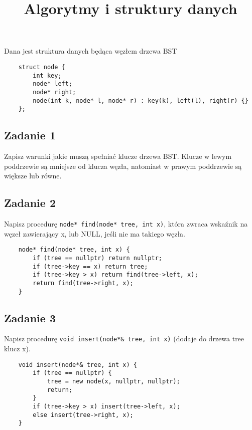 \documentclass{article}
\begin{document}
\title{Algorytmy i struktury danych}
\author{}
\date{}
\maketitle

Dana jest struktura danych będąca węzłem drzewa BST
\begin{lstlisting}
    struct node {
        int key;
        node* left;
        node* right;
        node(int k, node* l, node* r) : key(k), left(l), right(r) {}
    };
\end{lstlisting}

\subsection*{Zadanie 1}
Zapisz warunki jakie muszą spełniać klucze drzewa BST.
\noindent
Klucze w lewym poddrzewie są mniejsze od klucza węzła, natomiast w prawym poddrzewie są większe lub równe.

\subsection*{Zadanie 2}
Napisz procedurę \verb|node* find(node* tree, int x)|, która zwraca wskaźnik na węzeł
zawierający x, lub NULL, jeśli nie ma takiego węzła.
\begin{lstlisting}
    node* find(node* tree, int x) {
        if (tree == nullptr) return nullptr;
        if (tree->key == x) return tree;
        if (tree->key > x) return find(tree->left, x);
        return find(tree->right, x);
    }
\end{lstlisting}

\subsection*{Zadanie 3}
Napisz procedurę \verb|void insert(node*& tree, int x)| (dodaje do drzewa tree klucz x).
\begin{lstlisting}
    void insert(node*& tree, int x) {
        if (tree == nullptr) {
            tree = new node(x, nullptr, nullptr);
            return;
        }
        if (tree->key > x) insert(tree->left, x);
        else insert(tree->right, x);
    }
\end{lstlisting}
\end{document}
